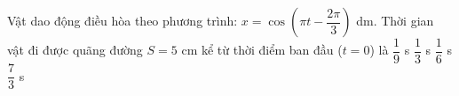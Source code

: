   \begin{vidu}%
  	Vật dao động điều hòa theo phương trình: $x = \cos(\pi t - \dfrac{2\pi}{3})$ dm. Thời gian vật đi được quãng đường $S = 5$ cm kể từ thời điểm ban đầu ($t = 0$) là
  	\choice
  	{ $\dfrac{1}{9}$ s}
  	{$\dfrac{1}{3}$ s}
  	{\True $\dfrac{1}{6}$ s}
  	{$\dfrac{7}{3}$ s}
  \end{vidu} %
